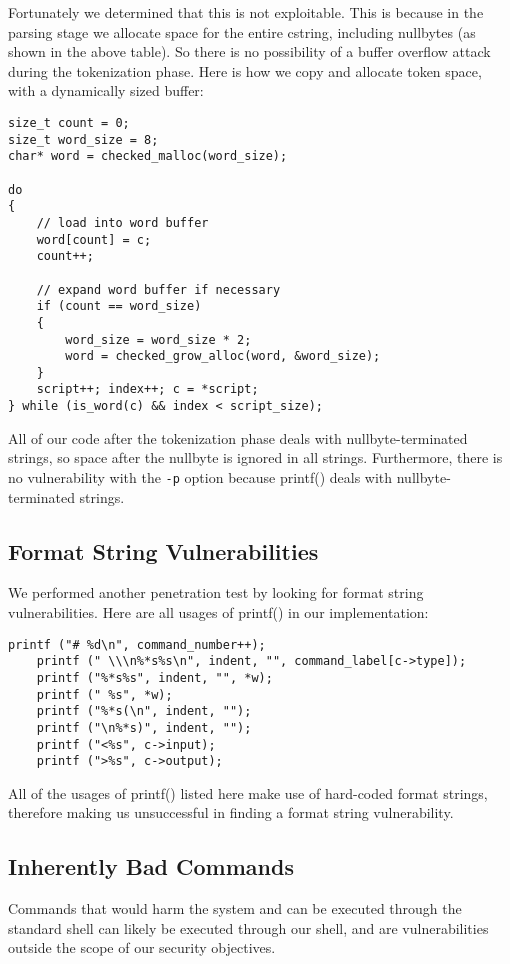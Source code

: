 \documentclass[12pt]{article}
\begin{document}
Fortunately we determined that this is not exploitable. This is because in the parsing stage we allocate space for the entire cstring, including nullbytes (as shown in the above table). So there is no possibility of a buffer overflow attack during the tokenization phase. Here is how we copy and allocate token space, with a dynamically sized buffer:

\begin{lstlisting}[frame=single]
size_t count = 0;
size_t word_size = 8;
char* word = checked_malloc(word_size);

do
{
	// load into word buffer
	word[count] = c;
	count++;

	// expand word buffer if necessary
	if (count == word_size)
	{
		word_size = word_size * 2;
		word = checked_grow_alloc(word, &word_size);
	}
	script++; index++; c = *script;
} while (is_word(c) && index < script_size);
\end{lstlisting}

All of our code after the tokenization phase deals with nullbyte-terminated strings, so space after the nullbyte is ignored in all strings. Furthermore, there is no vulnerability with the \texttt{-p} option because printf() deals with nullbyte-terminated strings.

\subsection{Format String Vulnerabilities}

We performed another penetration test by looking for format string vulnerabilities. Here are all usages of printf() in our implementation:

\begin{lstlisting}[frame=single]
	printf ("# %d\n", command_number++);
	printf (" \\\n%*s%s\n", indent, "", command_label[c->type]);
	printf ("%*s%s", indent, "", *w);
	printf (" %s", *w);
	printf ("%*s(\n", indent, "");
	printf ("\n%*s)", indent, "");
	printf ("<%s", c->input);
	printf (">%s", c->output);
\end{lstlisting}

All of the usages of printf() listed here make use of hard-coded format strings, therefore making us unsuccessful in finding a format string vulnerability.

\subsection{Inherently Bad Commands}
Commands that would harm the system and can be executed through the standard shell can likely be executed through our shell, and are vulnerabilities outside the scope of our security objectives.
\end{document}
